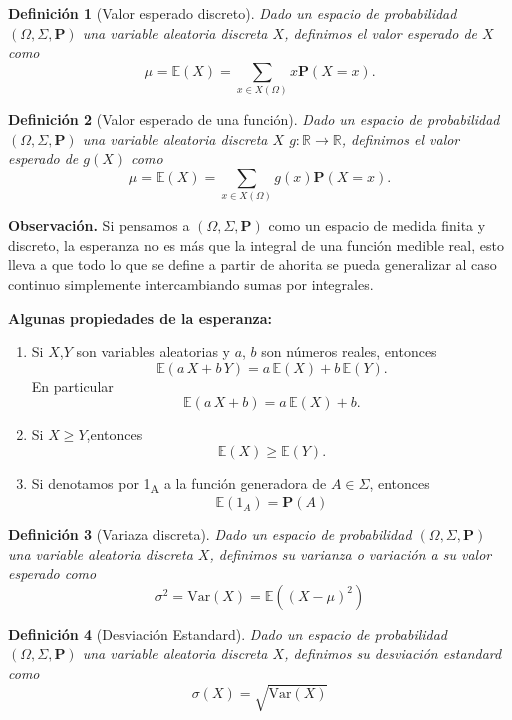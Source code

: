\documentclass[letterpaper]{book}
\newtheorem{def.}{Definici\'on}[section]
\newcommand{\prob}{\textbf{P}}
\newcommand{\esp}{\mathbb E}
\newcommand{\obs}{{\newline \noindent \sc \textbf{Observación. }}}
\newcommand{\om}{\ensuremath{\Omega}}
\newcommand{\sig}{\ensuremath{\Sigma}}
\newcommand{\re}{\ensuremath{\mathbb R }}
\begin{document}
\begin{def.}[Valor esperado discreto] 
Dado un espacio de probabilidad \((\om,\sig,\prob)\) una variable aleatoria discreta \(X\), definimos el valor esperado de \(X\) como
\[
    \mu=\esp(X)=\sum_{x\in X(\om)} x\prob(X=x).
\]
\end{def.}

\begin{def.}[Valor esperado de una función] 
Dado un espacio de probabilidad \((\om,\sig,\prob)\) una variable aleatoria discreta \(X\) \(g:\re\rightarrow\re\), definimos el valor esperado de \(g(X)\) como
\[
    \mu=\esp(X)=\sum_{x\in X(\om)} g(x)\prob(X=x).
\]
\end{def.}

\obs Si pensamos a \((\om,\sig,\prob)\) como un espacio de medida finita y discreto, la esperanza no es más que la integral de una función medible real, esto lleva a que todo lo que se define a partir de ahorita se pueda generalizar al caso continuo simplemente intercambiando sumas por integrales. 

\textbf{Algunas propiedades de la esperanza:}

\begin{enumerate}
\item Si \(X\),\(Y\) son variables aleatorias y \(a\), \(b\) son números reales, entonces
\[
   \esp(a\,X+b\,Y)=a\,\esp(X)+b\,\esp(Y).
   \]
\noindent En particular
\[
   \esp(a\,X+b)=a\,\esp(X)+b.
   \]
\item Si \(X\geq Y\),entonces
\[
   \esp(X)\geq\esp(Y).
   \]
\item Si denotamos por 1\textsubscript{A} a la función generadora de \(A\in\sig\), entonces
\[
   \esp(1_A)=\prob(A)
   \]
\end{enumerate}

\begin{def.}[Variaza discreta]
Dado un espacio de probabilidad \((\om,\sig,\prob)\) una variable aleatoria discreta \(X\), definimos su varianza o variación a su valor esperado como
\[
    \sigma^2=\mathrm{Var}(X)=\esp((X-\mu)^2)
\]
\end{def.}

\begin{def.}[Desviación Estandard]
Dado un espacio de probabilidad \((\om,\sig,\prob)\) una variable aleatoria discreta \(X\), definimos su \emph{desviación estandard} como
\[
    \sigma(X)=\sqrt{\mathrm{Var}(X)}
\]
\end{def.}
\end{document}
